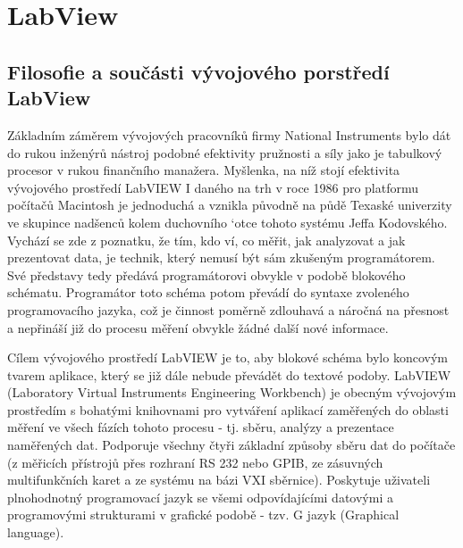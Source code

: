 \setchaptertoc
\chapter{LabView}\label{ES:kap_labview}


  \section{Filosofie a součásti vývojového porstředí LabView }
    Základním záměrem vývojových pracovníků firmy National Instruments bylo dát do rukou inženýrů
    nástroj podobné efektivity pružnosti a síly jako je tabulkový procesor v rukou finančního
    manažera. Myšlenka, na níž stojí efektivita vývojového prostředí LabVIEW I daného na trh v roce
    1986 pro platformu počítačů Macintosh je jednoduchá a vznikla původně na půdě Texaské univerzity
    ve skupince nadšenců kolem duchovního `otce tohoto systému Jeffa Kodovského. Vychází se zde z 
    poznatku, že tím, kdo ví, co měřit, jak analyzovat a jak prezentovat data, je technik, který
    nemusí být sám zkušeným programátorem. Své představy tedy předává programátorovi obvykle v
    podobě blokového schématu. Programátor toto schéma potom převádí do syntaxe zvoleného
    programovacího jazyka, což je činnost poměrně zdlouhavá a náročná na přesnost a nepřináší již do
    procesu měření obvykle žádné další nové informace.
     

    Cílem vývojového prostředí LabVIEW je to, aby blokové schéma bylo koncovým tvarem aplikace,
    který se již dále nebude převádět do textové podoby. LabVIEW (Laboratory Virtual Instruments
    Engineering Workbench) je obecným vývojovým prostředím s bohatými knihovnami pro vytváření
    aplikací zaměřených do oblasti měření ve všech fázích tohoto procesu - tj. sběru, analýzy a
    prezentace naměřených dat. Podporuje všechny čtyři základní způsoby sběru dat do počítače (z
    měřicích přístrojů přes rozhraní RS 232 nebo GPIB, ze zásuvných multifunkčních karet a ze
    systému na bázi VXI sběrnice). Poskytuje uživateli plnohodnotný programovací jazyk se všemi
    odpovídajícími datovými a programovými strukturami v grafické podobě - tzv. G jazyk (Graphical
    language)\cite[p.~21]{Zidek-2002-ID60}.

